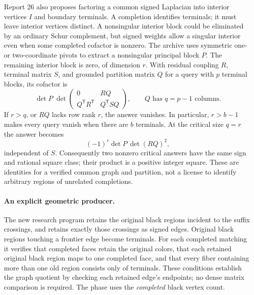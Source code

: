 Report 26 also proposes factoring a common signed Laplacian into interior
vertices $I$ and boundary terminals.  A completion identifies terminals;
it must leave interior vertices distinct.  A nonsingular interior block
could be eliminated by an ordinary Schur complement, but signed weights
allow a singular interior even when some completed cofactor is nonzero.
The archive uses symmetric one- or two-coordinate pivots to extract a
nonsingular principal block $P$.  The remaining interior block is zero,
of dimension $r$.  With residual coupling $R$, terminal matrix $S$, and
grounded partition matrix $Q$ for a query with $p$ terminal blocks, its
cofactor is
\[
 \det P\;\det
 \begin{pmatrix}
  0&RQ\\ Q^{\mathsf T}R^{\mathsf T}&Q^{\mathsf T}SQ
 \end{pmatrix},\qquad Q\text{ has }q=p-1\text{ columns}.
\]
If $r>q$, or $RQ$ lacks row rank $r$, the answer vanishes.  In
particular, $r>b-1$ makes every query vanish when there are $b$ terminals.
At the critical size $q=r$ the answer becomes
\[
                 (-1)^r\det P\,\det(RQ)^2,
\]
independent of $S$.  Consequently two nonzero critical answers have the
same sign and rational square class; their product is a positive integer
square.  These are identities for a verified common graph and partition,
not a license to identify arbitrary regions of unrelated completions.

\paragraph{An explicit geometric producer.}
The new research program
retains the original black regions incident to the suffix crossings,
and retains exactly those crossings as signed edges.  Original black
regions touching a frontier edge become terminals.  For each completed
matching it verifies that completed faces retain the original colors,
that each retained original black region maps to one completed face,
and that every fiber containing more than one old region consists only
of terminals.  These conditions establish the graph quotient by checking
each retained edge's endpoints; no dense matrix comparison is required.
The phase uses the \emph{completed} black vertex count.

